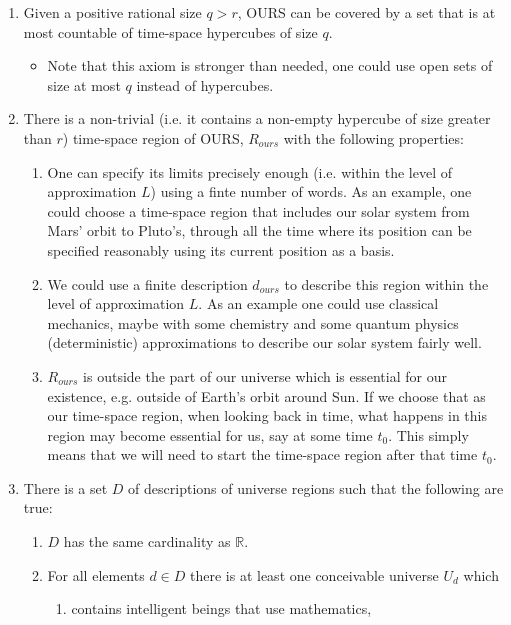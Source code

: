 \documentclass[a4paper
,draft
]{article}
\def\reale{\mathbb{R}}
\begin{document}
\begin{enumerate}
\item \label{countablecovering} Given a positive rational size $q>r$, OURS can be covered by a set that is at most countable of time-space hypercubes of size $q$.
  \begin{itemize}
    \item Note that this axiom is stronger than needed, one could use open sets of size at most $q$ instead of hypercubes.
  \end{itemize}

\item \label{nonessentialhypercube} There is a non-trivial (i.e. it contains a non-empty hypercube of size greater than $r$) time-space region of OURS, $R_{ours}$ with the following properties:
  \begin{enumerate}
    \item One can specify its limits precisely enough (i.e. within the level of approximation $L$) using a finte number of words. As an example, one could choose a time-space region that includes our solar system from Mars' orbit to Pluto's, through all the time where its position can be specified reasonably using its current position as a basis.
    \item We could use a finite description $d_{ours}$ to describe this region within the level of approximation $L$. As an example one could use classical mechanics, maybe with some chemistry and some quantum physics (deterministic) approximations to describe our solar system fairly well.
    \item $R_{ours}$ is outside the part of our universe which is essential for our existence, e.g. outside of Earth's orbit around Sun. If we choose that as our time-space region, when looking back in time, what happens in this region may become essential for us, say at some time $t_0$. This simply means that we will need to start the time-space region after that time $t_0$.
  \end{enumerate}
\item \label{uncountable} There is a set $D$ of descriptions of universe regions such that the following are true:
  \begin{enumerate}
    \item $D$ has the same cardinality as $\reale$.
    \item For all elements $d\in D$ there is at least one conceivable universe $U_d$ which
      \begin{enumerate}
        \item contains intelligent beings that use mathematics,

\end{enumerate}
\end{enumerate}
\end{enumerate}
\end{document}
